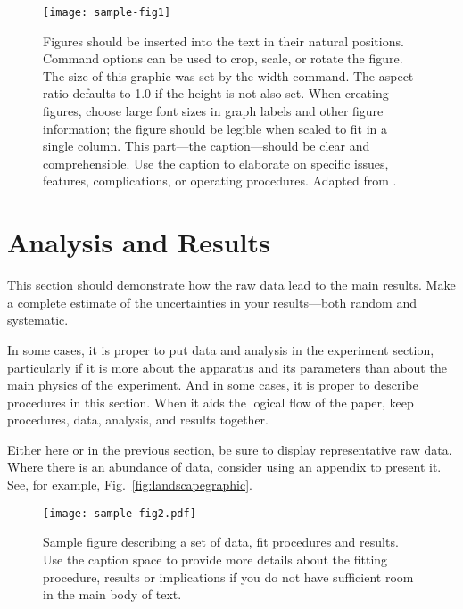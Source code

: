 \begin{figure}[htb]
\texttt{[image: sample-fig1]}
\caption{Figures should be inserted into the text in their natural positions.
Command options can be used to crop, scale, or rotate the figure.
The size of this graphic was set by the width command.
The aspect ratio defaults to 1.0 if the height is not also set.
When creating figures, choose large font sizes in graph labels and other figure information;
the figure should be legible when scaled to fit in a single column.
This part---the caption---should be clear and comprehensible.
Use the caption to elaborate on specific issues, features, complications, or operating procedures.
Adapted from \cite{melissinos1966,melissinos2003}.\label{fig:samplefig}}
\end{figure}

\section{Analysis and Results}

This section should demonstrate how the raw data lead to the main results.
Make a complete estimate of the uncertainties in your results---both
random and systematic.

In some cases, it is proper to put data and analysis in the experiment section,
particularly if it is more about the apparatus and its parameters than about the main physics
of the experiment.
And in some cases, it is proper to describe procedures in this section.
When it aids the logical flow of the paper, keep procedures,
data, analysis, and results together.

Either here or in the previous section, be sure to display representative raw data.
Where there is an abundance of data, consider using an appendix to present it.
See, for example, Fig.~\ref{fig:landscapegraphic}.

\begin{figure}[htb]
\texttt{[image: sample-fig2.pdf]}	%
\caption{Sample figure describing a set of data, fit procedures and
results. Use the caption space to provide more details about the
fitting procedure, results or implications if you do not have
sufficient room in the main body of text.
\label{fig:calibration}
}
\end{figure}


